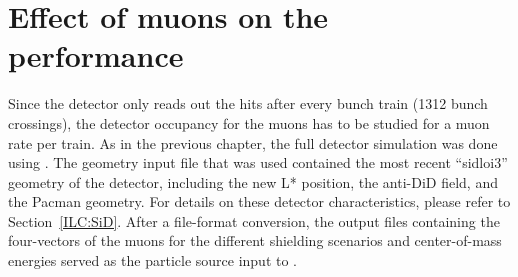 \section{Effect of muons on the \sid performance}
\label{BDS_Muons:SiD}
Since the \sid detector only reads out the hits after every bunch train (1312 bunch crossings), the detector occupancy for the muons has to be studied for a muon rate per train.
As in the previous chapter, the full detector simulation was done using \slic.
The geometry input file that was used contained the most recent ``sidloi3'' geometry of the \sid detector, including the new L* position, the anti-DiD field, and the Pacman geometry.
For details on these detector characteristics, please refer to Section~\ref{ILC:SiD}.
After a file-format conversion, the \mucarlo output files containing the four-vectors of the muons for the different shielding scenarios and center-of-mass energies served as the particle source input to \slic.

